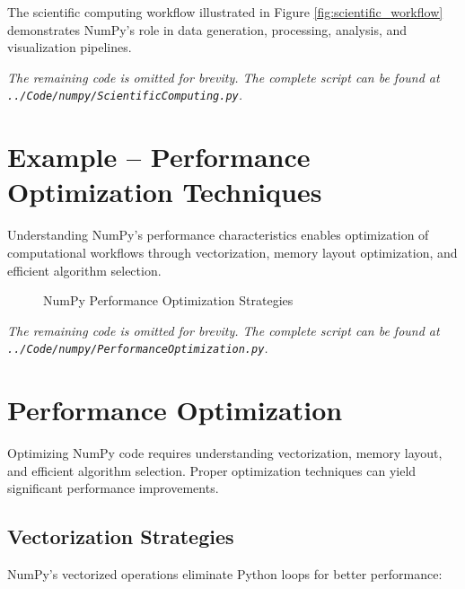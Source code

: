 The scientific computing workflow illustrated in Figure \ref{fig:scientific_workflow} demonstrates NumPy's role in data generation, processing, analysis, and visualization pipelines.


\noindent\textit{The remaining code is omitted for brevity. The complete script can be found at \texttt{../Code/numpy/ScientificComputing.py}.}

\section{Example -- Performance Optimization Techniques}
\label{sec:performance_example}

Understanding NumPy's performance characteristics enables optimization of computational workflows through vectorization, memory layout optimization, and efficient algorithm selection.

\begin{figure}[htbp]
	\centering
    
	\caption{NumPy Performance Optimization Strategies}
	\label{fig:performance_optimization}
\end{figure}


\noindent\textit{The remaining code is omitted for brevity. The complete script can be found at \texttt{../Code/numpy/PerformanceOptimization.py}.}

\section{Performance Optimization}
\label{sec:optimization}

Optimizing NumPy code requires understanding vectorization, memory layout, and efficient algorithm selection. Proper optimization techniques can yield significant performance improvements.

\subsection{Vectorization Strategies}
\label{subsec:vectorization}

NumPy's vectorized operations eliminate Python loops for better performance:

